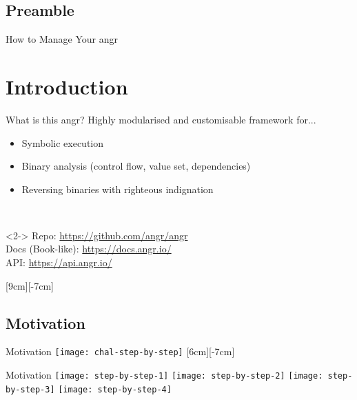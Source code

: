 \documentclass[xcolor={dvipsnames}]{beamer}
\begin{document}
\subsection{Preamble}
\begin{frame}{How to Manage Your angr}
    \tableofcontents[hideallsubsections]
\end{frame}


\section{Introduction}
\frame{\sectionpage}
\begin{frame}{What is this angr?}
    Highly modularised and customisable framework for...
    \begin{itemize}
        \item Symbolic execution
        \item Binary analysis (control flow, value set, dependencies)
        \item Reversing binaries with righteous indignation
    \end{itemize}
    \-\\
    \begin{uncoverenv}<2->
        Repo: \url{https://github.com/angr/angr} \\
        Docs (Book-like): \url{https://docs.angr.io/} \\
        API: \url{https://api.angr.io/}
    \end{uncoverenv}

    [9cm][-7cm]
\end{frame}

\subsection{Motivation}
\begin{frame}{Motivation}
    \vskip5pt
    \centering
    \texttt{[image: chal-step-by-step]}
    [6cm][-7cm]
\end{frame}
\begin{frame}{Motivation}
    \centering
    \texttt{[image: step-by-step-1]}
    \texttt{[image: step-by-step-2]}
    \texttt{[image: step-by-step-3]}
    \texttt{[image: step-by-step-4]}
\end{frame}
\end{document}
